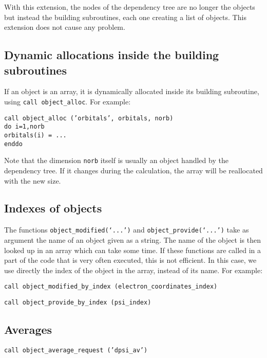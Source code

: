 \documentclass[a4paper,11pt]{article}
\begin{document}
\vspace{0.5cm}
With this extension, the nodes of the dependency tree are no longer the objects but instead the building subroutines, each one creating a list of objects. This extension does not cause any problem.

\subsection{Dynamic allocations inside the building subroutines}

If an object is an array, it is dynamically allocated inside its building subroutine, using {\tt call object\_alloc}. For example:

\vspace{0.5cm}
\noindent
{\tt call object\_alloc ('orbitals', orbitals, norb)\\
do i=1,norb\\
\phantom{xx} orbitals(i) = ...\\
enddo}

Note that the dimension {\tt norb} itself is usually an object handled by the dependency tree. If it changes during the calculation, the array will be reallocated with the new size.

\subsection{Indexes of objects}
The functions {\tt object\_modified(`...')} and {\tt object\_provide(`...')} take as argument the name of an object given as a string. The name of the object is then looked up in an array which can take some time. If these functions are called in a part of the code that is very often executed, this is not efficient. In this case, we use directly the index of the object in the array, instead of its name. For example:

\vspace{0.5cm}
\noindent
{\tt call object\_modified\_by\_index (electron\_coordinates\_index)}

\vspace{0.5cm}
\noindent
{\tt call object\_provide\_by\_index (psi\_index)}

\subsection{Averages}

\vspace{0.5cm}
\noindent
{\tt call object\_average\_request ('dpsi_av')}
\end{document}
